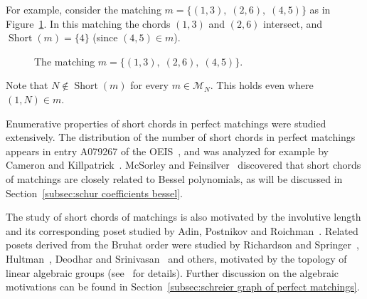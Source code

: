 \documentclass[ALCO]{cedram}
\newcommand{\Short}{\operatorname{Short}}
\newcommand{\M}{\mathcal{M}}
\begin{document}
For example, consider the matching $m = \{(1,3),\; (2,6),\; (4,5)\}$ as in Figure~\ref{fig:matching example introduction}. In this matching the chords $(1,3)$ and $(2,6)$ intersect, and $\Short(m) = \{4\}$ (since $(4,5) \in m$).
\begin{figure}[htb]
    \begin{center}
    \end{center}
    \caption{The matching $m = \{(1,3),\; (2,6),\; (4,5)\}$.}
    \label{fig:matching example introduction}
\end{figure}

Note that $N \notin \Short(m)$ for every $m \in \M_N$. This holds even where $(1,N) \in m$.



Enumerative properties of short chords in perfect matchings were studied extensively. The distribution of the number of short chords in perfect matchings appears in entry A079267 of the OEIS~\cite{oeis}, and was analyzed for example by Cameron and Killpatrick~\cite{killpatrick2020statistics}. McSorley and Feinsilver~\cite{bessel_polynomials_mathcings} discovered that short chords of matchings are closely related to Bessel polynomials, as will be discussed in Section~\ref{subsec:schur coefficients bessel}.

The study of short chords of matchings is also motivated by the involutive length and its corresponding poset studied by Adin, Postnikov and Roichman~\cite{gelfand_involutions}. Related posets derived from the Bruhat order were studied by Richardson and Springer~\cite{richardson1990bruhat}, Hultman~\cite{hultman2008twisted}, Deodhar and Srinivasan~\cite{deodhar2001statistic} and others, motivated by the topology of linear algebraic groups (see~\cite{hultman2008twisted} for details). Further discussion on the algebraic motivations can be found in Section~\ref{subsec:schreier graph of perfect matchings}.
\end{document}
